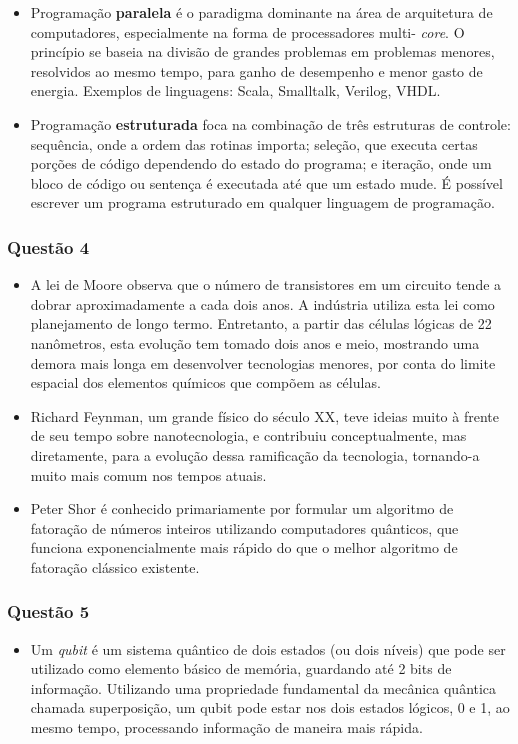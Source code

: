 \documentclass{article}
\begin{document}
\begin{itemize}
    \item Programação \textbf{paralela} é o paradigma dominante na área de
    arquitetura de computadores, especialmente na forma de processadores multi-
    \textit{core}. O princípio se baseia na divisão de grandes problemas em
    problemas menores, resolvidos ao mesmo tempo, para ganho de desempenho e
    menor gasto de energia. Exemplos de linguagens: Scala, Smalltalk, Verilog,
    VHDL.

    \item Programação \textbf{estruturada} foca na combinação de três estruturas
    de controle: sequência, onde a ordem das rotinas importa; seleção, que
    executa certas porções de código dependendo do estado do programa; e
    iteração, onde um bloco de código ou sentença é executada até que um estado
    mude. É possível escrever um programa estruturado em qualquer linguagem de
    programação.
\end{itemize}

\newpage

\subsubsection*{Questão 4}
\begin{itemize}
    \item A lei de Moore observa que o número de transistores em um circuito
    tende a dobrar aproximadamente a cada dois anos. A indústria utiliza esta
    lei como planejamento de longo termo. Entretanto, a partir das células
    lógicas de 22 nanômetros, esta evolução tem tomado dois anos e meio,
    mostrando uma demora mais longa em desenvolver tecnologias menores, por
    conta do limite espacial dos elementos químicos que compõem as células.

    \item Richard Feynman, um grande físico do século XX, teve ideias muito à
    frente de seu tempo sobre nanotecnologia, e contribuiu conceptualmente, mas
    diretamente, para a evolução dessa ramificação da tecnologia, tornando-a
    muito mais comum nos tempos atuais.

    \item Peter Shor é conhecido primariamente por formular um algoritmo de
    fatoração de números inteiros utilizando computadores quânticos, que
    funciona exponencialmente mais rápido do que o melhor algoritmo de
    fatoração clássico existente.
\end{itemize}

\subsubsection*{Questão 5}
\begin{itemize}
    \item Um \textit{qubit} é um sistema quântico de dois estados (ou dois
    níveis) que pode ser utilizado como elemento básico de memória, guardando
    até 2 bits de informação. Utilizando uma propriedade fundamental da mecânica
    quântica chamada superposição, um qubit pode estar nos dois estados lógicos,
    0 e 1, ao mesmo tempo, processando informação de maneira mais rápida.
\end{itemize}
\end{document}
